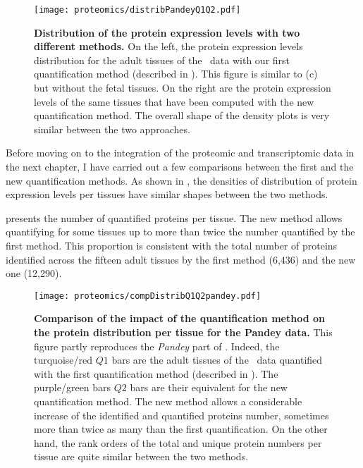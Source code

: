 \begin{figure}[!htbp]
    \texttt{[image: proteomics/distribPandeyQ1Q2.pdf]}\centering
    \vspace{-2mm}
    \caption[Pandey data protein expression distribution
    with two quantification methods]{\label{fig:pandeyDistribQ1Q2}\textbf{Distribution
    of the protein expression levels with two different methods.}
    On the left, the protein expression levels distribution for the adult
    tissues of the \pandey\ data with our first quantification method
    (described in ).
    This figure is similar to (c) but without the fetal tissues.
    On the right are the protein expression levels of the same tissues that
    have been computed with the new quantification method.
    The overall shape of the density plots is very similar between the two approaches.
    }
\end{figure}

Before moving on to the integration of the proteomic and transcriptomic data
in the next chapter,
I have carried out a few comparisons
between the first and the new quantification methods.
As shown in ,
the densities of distribution of protein expression levels per tissues
have similar shapes between the two methods.

 presents the number of quantified proteins per tissue.
The new method allows quantifying for some tissues
up to more than twice the number quantified by the first method.
This proportion is consistent with the total number of proteins identified
across the fifteen adult tissues
by the first method (6,436)
and the new one (12,290).

\begin{figure}[!ht]
    \texttt{[image: proteomics/compDistribQ1Q2pandey.pdf]}\centering
    \vspace{-3.5mm}
    \caption[Comparison of the impact of the quantification method on the
    protein distribution per tissue for Pandey data]{\label{fig:pandeyQ1Q2comp}\textbf{Comparison of
    the impact of the quantification method on the protein distribution per tissue
    for the Pandey data.}
    This figure partly reproduces the \emph{Pandey} part
    of .
    Indeed, the turquoise/red $Q1$ bars are the adult tissues of the \pandey\ data
    quantified with the first quantification method
    (described in ).
    The purple/green bars $Q2$ bars are their equivalent
    for the new quantification method.
    The new method allows a considerable increase of
    the identified and quantified proteins number,
    sometimes more than twice as many than the first quantification.
    On the other hand, the rank orders of the total and unique protein numbers per tissue
    are quite similar between the two methods.
    }
\end{figure}

